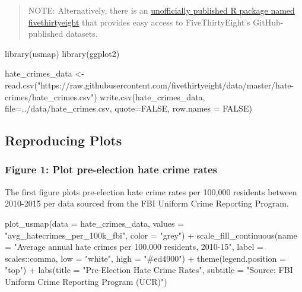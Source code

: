 \documentclass[
  letterpaper,
  DIV=11,
  numbers=noendperiod]{scrartcl}
\newenvironment{Shaded}{\begin{snugshade}}{\end{snugshade}}
\newcommand{\AttributeTok}[1]{\textcolor[rgb]{0.40,0.45,0.13}{#1}}
\newcommand{\ConstantTok}[1]{\textcolor[rgb]{0.56,0.35,0.01}{#1}}
\newcommand{\FunctionTok}[1]{\textcolor[rgb]{0.28,0.35,0.67}{#1}}
\newcommand{\NormalTok}[1]{\textcolor[rgb]{0.00,0.23,0.31}{#1}}
\newcommand{\OtherTok}[1]{\textcolor[rgb]{0.00,0.23,0.31}{#1}}
\newcommand{\SpecialCharTok}[1]{\textcolor[rgb]{0.37,0.37,0.37}{#1}}
\newcommand{\StringTok}[1]{\textcolor[rgb]{0.13,0.47,0.30}{#1}}
\begin{document}
\begin{quote}
NOTE: Alternatively, there is an
\href{https://cran.r-project.org/web/packages/fivethirtyeight/vignettes/fivethirtyeight.html}{unofficially
published R package named fivethirtyeight} that provides easy access to
FiveThirtyEight's GitHub-published datasets.
\end{quote}

\begin{Shaded}
\begin{Highlighting}[]
\FunctionTok{library}\NormalTok{(usmap)}
\FunctionTok{library}\NormalTok{(ggplot2)}

\NormalTok{hate\_crimes\_data }\OtherTok{\textless{}{-}} \FunctionTok{read.csv}\NormalTok{(}\StringTok{"https://raw.githubusercontent.com/fivethirtyeight/data/master/hate{-}crimes/hate\_crimes.csv"}\NormalTok{)}
\FunctionTok{write.csv}\NormalTok{(hate\_crimes\_data, }\AttributeTok{file=}\StringTok{\textquotesingle{}../data/hate\_crimes.csv\textquotesingle{}}\NormalTok{, }\AttributeTok{quote=}\ConstantTok{FALSE}\NormalTok{, }\AttributeTok{row.names =} \ConstantTok{FALSE}\NormalTok{)}
\end{Highlighting}
\end{Shaded}

\hypertarget{reproducing-plots}{%
\subsection{Reproducing Plots}\label{reproducing-plots}}

\hypertarget{figure-1-plot-pre-election-hate-crime-rates}{%
\subsubsection{Figure 1: Plot pre-election hate crime
rates}\label{figure-1-plot-pre-election-hate-crime-rates}}

The first figure plots pre-election hate crime rates per 100,000
residents between 2010-2015 per data sourced from the FBI Uniform Crime
Reporting Program.

\begin{Shaded}
\begin{Highlighting}[]
\FunctionTok{plot\_usmap}\NormalTok{(}\AttributeTok{data =}\NormalTok{ hate\_crimes\_data, }\AttributeTok{values =} \StringTok{"avg\_hatecrimes\_per\_100k\_fbi"}\NormalTok{, }\AttributeTok{color =} \StringTok{"grey"}\NormalTok{) }\SpecialCharTok{+} 
  \FunctionTok{scale\_fill\_continuous}\NormalTok{(}\AttributeTok{name =} \StringTok{"Average annual hate crimes per 100,000 residents, 2010{-}15"}\NormalTok{, }\AttributeTok{label =}\NormalTok{ scales}\SpecialCharTok{::}\NormalTok{comma, }\AttributeTok{low =} \StringTok{"white"}\NormalTok{, }\AttributeTok{high =} \StringTok{"\#ed4900"}\NormalTok{) }\SpecialCharTok{+} 
  \FunctionTok{theme}\NormalTok{(}\AttributeTok{legend.position =} \StringTok{"top"}\NormalTok{) }\SpecialCharTok{+}
  \FunctionTok{labs}\NormalTok{(}\AttributeTok{title =} \StringTok{"Pre{-}Election Hate Crime Rates"}\NormalTok{,}
       \AttributeTok{subtitle =} \StringTok{"Source: FBI Uniform Crime Reporting Program (UCR)"}\NormalTok{)}
\end{Highlighting}
\end{Shaded}
\end{document}
